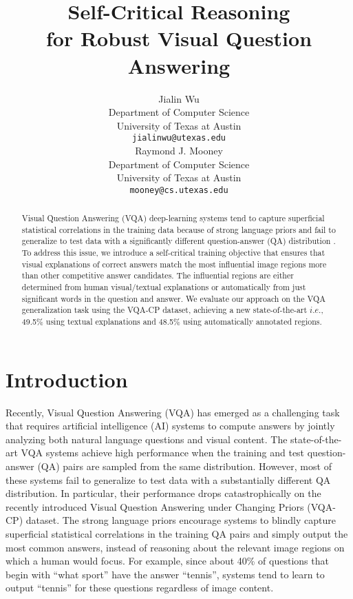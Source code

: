 \documentclass{article}
\title{Self-Critical Reasoning \\ for Robust Visual Question Answering}
\author{
Jialin Wu \\
   Department of Computer Science\\
   University of Texas at Austin\\
  \texttt{jialinwu@utexas.edu} \\
   \And
   Raymond J. Mooney \\
   Department of Computer Science\\
   University of Texas at Austin\\
   \texttt{mooney@cs.utexas.edu} \\
}
\begin{document}
\maketitle

\begin{abstract}
Visual Question Answering (VQA) deep-learning systems tend to capture superficial statistical correlations in the training data because of strong language priors and fail to generalize to test data with a significantly different question-answer (QA) distribution \cite{vqa-cp}. To address this issue, we introduce a self-critical training objective that ensures that visual explanations of correct answers match the most influential image regions more than other competitive answer candidates. The influential regions are either determined from human visual/textual explanations or automatically from just significant words in the question and answer. We evaluate our approach on the VQA generalization task using the VQA-CP dataset, achieving a new state-of-the-art $i.e., $ 49.5\% using textual explanations and 48.5\% using automatically annotated regions.

\end{abstract}

\section{Introduction}
Recently, Visual Question Answering (VQA) \cite{antol2015vqa} has emerged as a challenging task that requires artificial intelligence (AI) systems to compute answers by jointly analyzing both natural language questions and visual content. The state-of-the-art VQA systems \cite{fukui2016multimodal,anderson2017bottom,vqa-cp,andreas2016neural,hu2018explainable,yang2016stacked,selvaraju2019taking,wu2019generating,jiang2018pythia,kim2018bilinear,ramakrishnan2018overcoming} achieve high performance when the training and test question-answer (QA) pairs are sampled from the same distribution. However, most of these systems fail to generalize to test data with a substantially different QA distribution. In particular, their performance drops catastrophically on the recently introduced Visual Question Answering under Changing Priors (VQA-CP) \cite{vqa-cp} dataset. The strong language priors encourage systems to blindly capture superficial statistical correlations in the training QA pairs and simply output the most common answers, instead of reasoning about the relevant image regions on which a human would focus. For example, since about 40\% of questions that begin with ``what sport'' have the answer ``tennis'', systems tend to learn to output ``tennis'' for these questions regardless of image content. 
\end{document}
